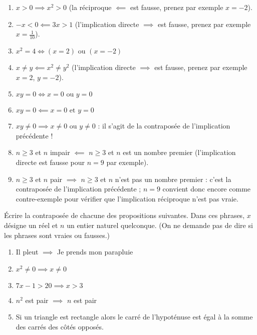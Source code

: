 \documentclass[11pt,class=report,crop=false]{standalone}
\begin{document}
\correction
\sauteligne
\begin{enumerate}
    \item $x > 0 \implies  x^2 > 0$ (la réciproque $\impliedby$ est fausse, prenez par exemple $x=-2$).
    
    \item $ -x < 0 \impliedby 3x > 1  $  (l'implication directe $\implies$ est fausse, prenez par exemple $x=\frac1{10}$).  
    
    \item $x^2 = 4  \iff (x = 2)  \text{ ou } (x = -2)$    
      
    \item $x \neq y \impliedby  x^2 \neq y^2$ (l'implication directe $\implies$ est fausse, prenez par exemple $x=2$, $y=-2$).
    
    \item $xy = 0 \iff x = 0 \text{ ou } y = 0$
        
    \item $xy = 0 \impliedby  x = 0 \text{ et } y = 0$
    
    \item $xy \neq 0 \implies x \neq 0 \text{ ou } y \neq 0$  \quad : il s'agit de la contraposée de l'implication précédente !
    
    \item $n \ge 3$ et $n$ impair  $\impliedby$   $n \ge 3$ et $n$ est un nombre premier (l'implication directe est fausse pour $n=9$ par exemple).
    
    \item $n \ge 3$ et $n$ pair $\implies$  $n \ge 3$ et $n$ n'est pas un nombre premier \quad : c'est la contraposée de l'implication précédente ; $n=9$ convient donc encore comme contre-exemple pour vérifier que l'implication réciproque n'est pas vraie.     
\end{enumerate} 
\fincorrection
\finexercice




\exercice{}
\enonce
Écrire la contraposée de chacune des propositions suivantes. 
Dans ces phrases, $x$ désigne un réel et $n$ un entier naturel quelconque.
(On ne demande pas de dire si les phrases sont vraies ou fausses.)
\begin{enumerate}
    \item Il pleut $\implies$ Je prends mon parapluie
    \item $x^2 \neq 0 \implies x \neq 0$ 
    \item $7x-1 > 20 \implies x > 3$ 
    \item $n^2$ est pair $\implies$ $n$ est pair 
    \item Si un triangle est rectangle alors le carré de l'hypoténuse est égal à la somme des carrés des côtés opposés.
\end{enumerate} 
\finenonce
\end{document}
